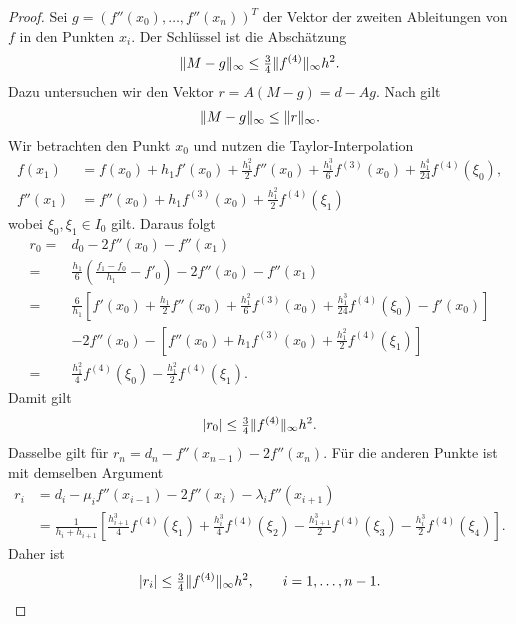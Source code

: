 \begin{proof}
  Sei $g = (f''(x_0),\dots,f''(x_n))^T$ der Vektor der zweiten
  Ableitungen von $f$ in den Punkten $x_i$. Der Schlüssel ist die
  Abschätzung
  \begin{gather}
    \lVert M-g\rVert_\infty \le \tfrac34 \lVert f^{(4)}\rVert_\infty h^2.
  \end{gather}
  Dazu untersuchen wir den Vektor $r = A(M-g) = d-Ag$. Nach
   gilt
  \begin{gather}
    \lVert M-g\rVert_\infty \le \lVert r\rVert_\infty.
  \end{gather}
  Wir betrachten den Punkt $x_0$ und nutzen die Taylor-Interpolation
  \begin{align}
    f(x_1) &= f(x_0) + h_1 f'(x_0) + \frac{h_1^2}{2} f''(x_0)
    + \frac{h_1^3}{6} f^{(3)}(x_0) + \frac{h_1^4}{24} f^{(4)}(\xi_0),\\
    f''(x_1) &= f''(x_0) + h_1 f^{(3)}(x_0)
                 + \frac{h_1^2}{2} f^{(4)}(\xi_1)
  \end{align}
  wobei $\xi_0,\xi_1\in I_0$ gilt. Daraus folgt
  \begin{align}
    r_0 =& d_0 - 2f''(x_0) - f''(x_1)\\
    =& \frac{h_1}6\left(\frac{f_1-f_0}{h_1} - f'_0\right)
       - 2f''(x_0) - f''(x_1)\\
    =& \frac{6}{h_1}\left[
      f'(x_0) + \frac{h_1}{2} f''(x_0)
    + \frac{h_1^2}{6} f^{(3)}(x_0) + \frac{h_1^3}{24} f^{(4)}(\xi_0)
      - f'(x_0)\right]\\
      &-2 f''(x_0) - \left[
        f''(x_0) + h_1 f^{(3)}(x_0) + \frac{h_1^2}{2} f^{(4)}(\xi_1)
        \right]\\
    =& \frac{h_1^2}{4} f^{(4)}(\xi_0) - \frac{h_1^2}{2} f^{(4)}(\xi_1).
  \end{align}
  Damit gilt
  \begin{gather}
    \lvert r_0\rvert \le \tfrac34 \lVert f^{(4)}\rVert_\infty h^2.
  \end{gather}
  Dasselbe gilt für $r_n = d_n - f''(x_{n-1}) - 2 f''(x_n)$. Für die
  anderen Punkte ist mit demselben Argument
  \begin{align}
    r_i &= d_i - \mu_i f''(x_{i-1}) - 2 f''(x_i) - \lambda_i f''(x_{i+1})
    \\
    &= \frac1{h_i+h_{i+1}} \left[
      \frac{h_{i+1}^3}{4} f^{(4)}(\xi_1)
      +\frac{h_i^3}{4} f^{(4)}(\xi_2)
      -\frac{h_{1+1}^3}{2} f^{(4)}(\xi_3)
      -\frac{h_i^3}{2} f^{(4)}(\xi_4)
      \right].
  \end{align}
  Daher ist
  \begin{gather}
    \lvert r_i\rvert \le \tfrac34 \lVert f^{(4)}\rVert_\infty h^2,
    \qquad i=1,\dots,n-1.
  \end{gather}
\end{proof}

